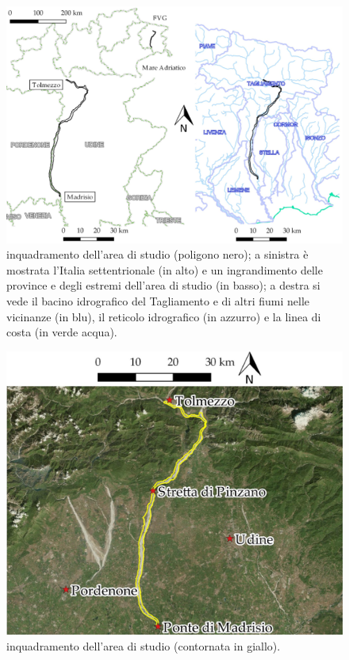 %
\begin{figure}
	\centering
	\includegraphics[width=\textwidth]{files/overview.jpeg}
	\caption[inquadramento dell'area di studio]
		{inquadramento dell'area di studio (poligono nero); a sinistra è mostrata l'Italia settentrionale (in alto) e un ingrandimento delle province e degli estremi dell'area di studio (in basso); a destra si vede il bacino idrografico del Tagliamento e di altri fiumi nelle vicinanze (in blu), il reticolo idrografico (in azzurro) e la linea di costa (in verde acqua).}
	\label{fig:overview}
\end{figure}
%
\begin{figure}
	\centering
	\includegraphics[width=\textwidth]{files/overview_tratto_sat.jpeg}
	\caption[inquadramento dell'area di studio]{inquadramento dell'area di studio (contornata in giallo).}
	\label{fig:overview-sat}
\end{figure}



